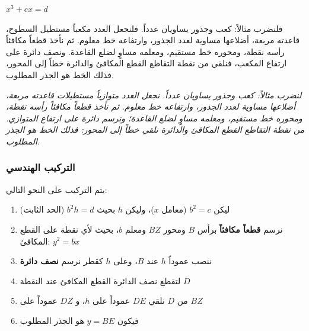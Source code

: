 \documentclass[11pt,a4paper]{book}
\newcommand{\ar}[1]{\leavevmode\arabicfont\beginR #1\endR}
\newenvironment{propbox}[1][]
  {\def\propboxtitle{#1}%
   \begin{snugshade}%
   \ifx\propboxtitle\empty\else
     \noindent{\bfseries\arabicfontbold\beginR #1\endR}\par\vspace{2pt}
   \fi}
  {\end{snugshade}}
\begin{document}
\begin{propbox}[$x^3 + cx = d$]

\ar{فلنضرب مثالاً: كعب وجذور يساويان عدداً. فلنجعل العدد مكعباً مستطيل السطوح، قاعدته مربعة، أضلاعها مساوية لعدد الجذور، وارتفاعه خط معلوم. ثم نأخذ قطعاً مكافئاً رأسه نقطة، ومحوره خط مستقيم، ومعلمه مساوٍ لضلع القاعدة. ونصف دائرة على ارتفاع المكعب، فنلقي من نقطة التقاطع القطع المكافئ والدائرة خطاً إلى المحور، فذلك الخط هو الجذر المطلوب.}

\vspace{0.3cm}

\textit{لنضرب مثالاً: كعب وجذور يساويان عدداً. نجعل العدد متوازياً مستطيلات قاعدته مربعة، أضلاعها مساوية لعدد الجذور، وارتفاعه خط معلوم. ثم نأخذ قطعاً مكافئاً رأسه نقطة، ومحوره خط مستقيم، ومعلمه مساوٍ لضلع القاعدة؛ ونرسم دائرة على ارتفاع المتوازي. من نقطة التقاطع القطع المكافئ والدائرة نلقي خطاً إلى المحور: فذلك الخط هو الجذر المطلوب.}

\end{propbox}

\subsubsection{\ar{التركيب الهندسي}}

\ar{يتم التركيب على النحو التالي:}

\begin{enumerate}[noitemsep]
\item \ar{ليكن} $b^2 = c$ \ar{(معامل} $x$\ar{)، وليكن} $h$ \ar{بحيث} $b^2 h = d$ \ar{(الحد الثابت)}
\item \ar{نرسم \textbf{قطعاً مكافئاً} برأس} $B$ \ar{ومحور} $BZ$ \ar{ومعلم} $b$\ar{، بحيث لأي نقطة على القطع المكافئ:} $y^2 = bx$
\item \ar{ننصب عموداً} $h$ \ar{عند} $B$\ar{، وعلى} $h$ \ar{كقطر نرسم \textbf{نصف دائرة}}
\item \ar{لتقطع نصف الدائرة القطع المكافئ عند النقطة} $D$
\item \ar{من} $D$ \ar{نلقي} $DE$ \ar{عموداً على} $h$\ar{، و} $DZ$ \ar{عموداً على} $BZ$
\item \ar{فيكون} $y = BE$ \ar{هو الجذر المطلوب}
\end{enumerate}
\end{document}
